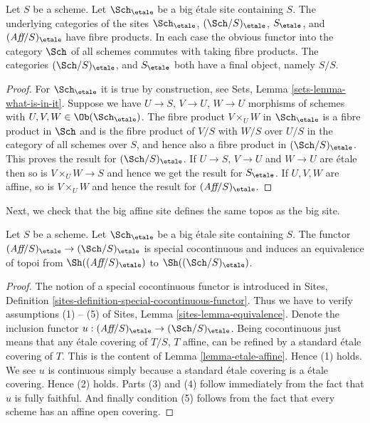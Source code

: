 \begin{lemma}
\label{lemma-fibre-products-etale}
Let $S$ be a scheme. Let $\Sch_\etale$ be a big \'etale
site containing $S$. The underlying categories of the sites
$\Sch_\etale$, $(\Sch/S)_\etale$,
$S_\etale$, and $(\textit{Aff}/S)_\etale$ have fibre products.
In each case the obvious functor into the category $\Sch$ of
all schemes commutes with taking fibre products. The categories
$(\Sch/S)_\etale$, and $S_\etale$ both have a
final object, namely $S/S$.
\end{lemma}

\begin{proof}
For $\Sch_\etale$ it is true by construction, see
Sets, Lemma \ref{sets-lemma-what-is-in-it}.
Suppose we have $U \to S$, $V \to U$, $W \to U$ morphisms
of schemes with $U, V, W \in \Ob(\Sch_\etale)$.
The fibre product $V \times_U W$ in $\Sch_\etale$
is a fibre product in $\Sch$ and
is the fibre product of $V/S$ with $W/S$ over $U/S$ in
the category of all schemes over $S$, and hence also a
fibre product in $(\Sch/S)_\etale$.
This proves the result for $(\Sch/S)_\etale$.
If $U \to S$, $V \to U$ and $W \to U$ are \'etale then so is
$V \times_U W \to S$ and hence we get the result for $S_\etale$.
If $U, V, W$ are affine, so is $V \times_U W$ and hence the
result for $(\textit{Aff}/S)_\etale$.
\end{proof}

\noindent
Next, we check that the big affine site defines the same
topos as the big site.

\begin{lemma}
\label{lemma-affine-big-site-etale}
Let $S$ be a scheme. Let $\Sch_\etale$ be a big \'etale
site containing $S$.
The functor
$(\textit{Aff}/S)_\etale \to (\Sch/S)_\etale$
is special cocontinuous and induces an equivalence of topoi from
$\Sh((\textit{Aff}/S)_\etale)$ to
$\Sh((\Sch/S)_\etale)$.
\end{lemma}

\begin{proof}
The notion of a special cocontinuous functor is introduced in
Sites, Definition \ref{sites-definition-special-cocontinuous-functor}.
Thus we have to verify assumptions (1) -- (5) of
Sites, Lemma \ref{sites-lemma-equivalence}.
Denote the inclusion functor
$u : (\textit{Aff}/S)_\etale \to (\Sch/S)_\etale$.
Being cocontinuous just means that any \'etale covering of
$T/S$, $T$ affine, can be refined by a standard \'etale covering of $T$.
This is the content of
Lemma \ref{lemma-etale-affine}.
Hence (1) holds. We see $u$ is continuous simply because a standard
\'etale covering is a \'etale covering. Hence (2) holds.
Parts (3) and (4) follow immediately from the fact that $u$ is
fully faithful. And finally condition (5) follows from the
fact that every scheme has an affine open covering.
\end{proof}

